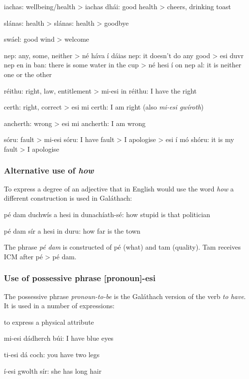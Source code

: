 iachas: wellbeing/health
> iachas dh\'{a}i: good health > cheers, drinking toast

sl\'{a}nas: health
> sl\'{a}nas: health > goodbye

sw\'{a}el: good wind > welcome

nep: any, some, neither
> n\'{e} h\'{a}va \'{i} d\'{a}ias nep: it doesn't do any good
> esi duvr nep en in ban: there is some water in the cup
> n\'{e} hesi \'{i} on nep al: it is neither one or the other

r\'{e}ithu: right, law, entitlement
> mi-esi in r\'{e}ithu: I have the right

certh: right, correct
> esi mi certh: I am right (also \textit{mi-esi gw\'{i}roth})

ancherth: wrong
> esi mi ancherth: I am wrong

s\'{o}ru: fault
> mi-esi s\'{o}ru: I have fault > I apologise
> esi \'{i} m\'{o} sh\'{o}ru: it is my fault > I apologise

\subsubsection{Alternative use of \textit{how}}

To express a degree of an adjective that in English would use the word \textit{how} a different construction is used in Gal\'{a}thach:

p\'{e} dam duchw\'{i}s a hesi in dunach\'{i}ath-s\'{e}: how stupid is that politician

p\'{e} dam s\'{i}r a hesi in duru: how far is the town

The phrase \textit{p\'{e} dam} is constructed of p\'{e} (what) and tam (quality). Tam receives ICM after p\'{e} > p\'{e} dam.

\subsubsection{Use of possessive phrase [pronoun]-esi}

The possessive phrase \textit{pronoun-to-be} is the Gal\'{a}thach version of the verb \textit{to have}. It is used in a number of expressions:

    to express a physical attribute

mi-esi d\'{a}dherch b\'{u}i: I have blue eyes

ti-esi d\'{a} coch: you have two legs

\'{i}-esi gwolth s\'{i}r: she has long hair


